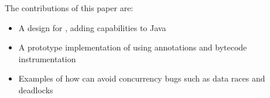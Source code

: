 %
The contributions of this paper are:
\begin{itemize}
\item A design for \jdala, adding \dala capabilities to Java
\item A prototype implementation of \jdala using annotations and bytecode instrumentation
\item Examples of how \jdala can avoid concurrency bugs such as data races and deadlocks
\end{itemize}
